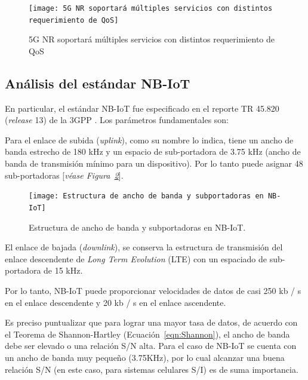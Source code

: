 \begin{figure}[th]
\centering
\texttt{[image: 5G NR soportará múltiples servicios con distintos requerimiento de QoS]}
\decoRule
\caption[5G NR soportará múltiples servicios con distintos requerimiento de QoS]{5G NR soportará múltiples servicios con distintos requerimiento de QoS}
\label{fig:5gqos}
\end{figure}

\subsection{Análisis del estándar NB-IoT} \label{NBIoT}

En particular, el estándar NB-IoT fue especificado en el reporte TR 45.820 (\textit{release} 13) de la 3GPP \parencite{3GPP2019}. Los parámetros fundamentales son:\newline

Para el enlace de subida (\textit{uplink}), como su nombre lo indica, tiene un ancho de banda estrecho de 180 kHz y un espacio de sub-portadora de 3.75 kHz (ancho de banda de transmisión mínimo para un dispositivo). Por lo tanto puede asignar 48 sub-portadoras [\textit{véase Figura~\ref{fig:NBIoT}}].

\begin{figure}[th]
\centering
\texttt{[image: Estructura de ancho de banda y subportadoras en NB-IoT]}
\decoRule
\caption[Estructura de ancho de banda y subportadoras en NB-IoT.]{Estructura de ancho de banda y subportadoras en NB-IoT.}
\label{fig:NBIoT}
\end{figure}

El enlace de bajada (\textit{downlink}), se conserva la estructura de transmisión del enlace descendente de \textit{Long Term Evolution} (LTE) con un espaciado de sub-portadora de 15 kHz.\newline

Por lo tanto, NB-IoT puede proporcionar velocidades de datos de casi 250 kb / s en el enlace descendente y 20 kb / s en el enlace ascendente.\newline

Es preciso puntualizar que para lograr una mayor tasa de datos, de acuerdo con el Teorema de Shannon-Hartley (Ecuación~\ref{eqn:Shannon}), el ancho de banda debe ser elevado o una relación S/N alta. Para el caso de NB-IoT se cuenta con un ancho de banda muy pequeño (3.75KHz), por lo cual alcanzar una buena relación S/N (en este caso, para sistemas celulares S/I) es de suma importancia.\\

